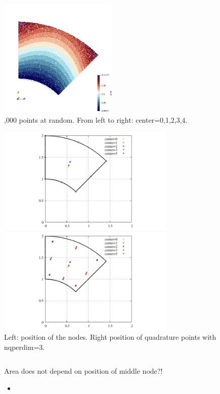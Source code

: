 \begin{center}
\includegraphics[width=5.7cm]{images/mappings/biquadratic3/elt4/jcob_4}\\
{,000 points at random. From left to right: center=0,1,2,3,4.} 
\end{center}




\begin{center}
\includegraphics[width=8.5cm]{images/mappings/biquadratic3/elt4/nodes}
\includegraphics[width=8.5cm]{images/mappings/biquadratic3/elt4/quads}\\
{\captionfont Left: position of the nodes. Right position of quadrature points with 
nqperdim=3.}
\end{center}

\begin{verbatim}

\end{verbatim}

Area does not depend on position of middle node?!




\vspace{1cm}

\Literature 
\begin{itemize}
\item {}
\end{itemize}








 
